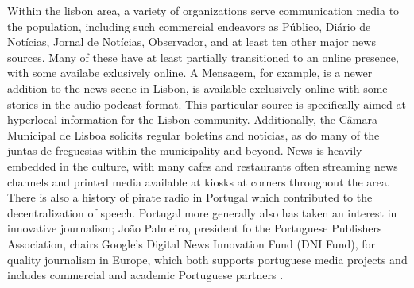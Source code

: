 Within the lisbon area, a variety of organizations serve communication media to the population, including such commercial endeavors as Público, Diário de Notícias, Jornal de Notícias, Observador, and at least ten other major news sources. Many of these have at least partially transitioned to an online presence, with some availabe exlusively online. A Mensagem, for example, is a newer addition to the news scene in Lisbon, is available exclusively online with some stories in the audio podcast format. This particular source is specifically aimed at hyperlocal information for the Lisbon community. Additionally, the Câmara Municipal de Lisboa solicits regular boletins and notícias, as do many of the juntas de freguesias within the municipality and beyond. News is heavily embedded in the culture, with many cafes and restaurants often streaming news channels and printed media available at kiosks at corners throughout the area. There is also a history of pirate radio in Portugal which contributed to the decentralization of speech\cite{Bonixe2019}. %
Portugal more generally also has taken an interest in innovative journalism; João Palmeiro, president fo the Portuguese Publishers Association, chairs Google's Digital News Innovation Fund (DNI Fund), for quality journalism in Europe, which both supports portuguese media projects and includes commercial and academic Portuguese partners \cite{DNIFund2018}. %
